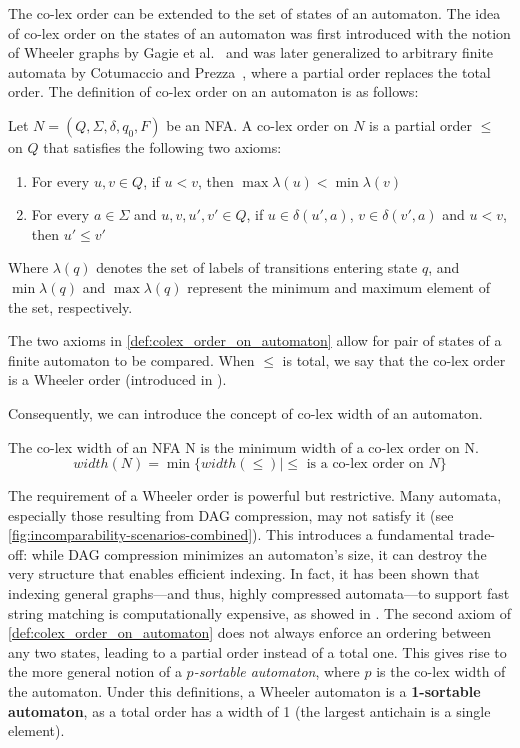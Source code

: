The co-lex order can be extended to the set of states of an automaton. The idea of co-lex order on the states of an automaton was first introduced with the notion of Wheeler graphs by Gagie et al.~\cite{gagie2017wheeler} and was later generalized to arbitrary finite automata by Cotumaccio and Prezza~\cite{cotumaccio2021indexing}, where a partial order replaces the total order. The definition of co-lex order on an automaton is as follows:

\begin{definition}
    \label{def:colex_order_on_automaton}
    Let $N = (Q, \Sigma, \delta, q_0, F)$ be an NFA. A co-lex order on $N$ is a partial order $\leq$ on $Q$ that satisfies the following two axioms:
    \begin{enumerate}[leftmargin=25pt]
        \item For every $u, v \in Q$, if $u < v$, then $\max\lambda(u) < \min\lambda(v)$
        \item For every $a \in \Sigma$ and $u, v, u', v' \in Q$, if $u \in \delta(u', a)$, $v \in \delta(v', a)$ and $u < v$, then $u' \leq v'$
    \end{enumerate}
\end{definition}
Where $\lambda(q)$ denotes the set of labels of transitions entering state $q$, and $\min\lambda(q)$ and $\max\lambda(q)$ represent the minimum and maximum element of the set, respectively.

The two axioms in \cref{def:colex_order_on_automaton} allow for pair of states of a finite automaton to be compared. When $\leq$ is total, we say that the co-lex order is a Wheeler order (introduced in \cite{gagie2017wheeler}). 

Consequently, we can introduce the concept of co-lex width of an automaton.
\begin{definition}
    The co-lex width of an NFA N is the minimum width of a co-lex order on N.
    $$
        width(N) = \min \{width(\leq)|\leq \text{ is a co-lex order on } N\}
    $$
\end{definition}

The requirement of a Wheeler order is powerful but restrictive. Many automata, especially those resulting from DAG compression, may not satisfy it (see \cref{fig:incomparability-scenarios-combined}). This introduces a fundamental trade-off: while DAG compression minimizes an automaton's size, it can destroy the very structure that enables efficient indexing. In fact, it has been shown that indexing general graphs—and thus, highly compressed automata—to support fast string matching is computationally expensive, as showed in \cite{equiGraphsCannotBe2023}. The second axiom of \cref{def:colex_order_on_automaton} does not always enforce an ordering between any two states, leading to a partial order instead of a total one. This gives rise to the more general notion of a \textit{$p$-sortable automaton}, where $p$ is the co-lex width of the automaton. Under this definitions, a Wheeler automaton is a \textbf{1-sortable automaton}, as a total order has a width of 1 (the largest antichain is a single element).

